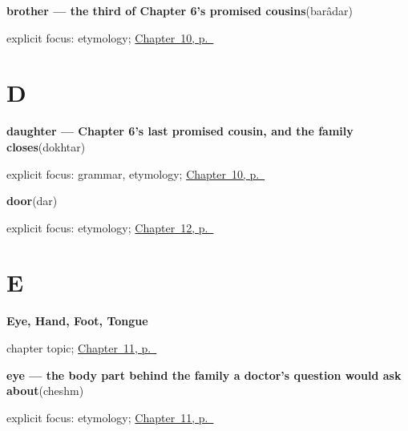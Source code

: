 \noindent\begin{minipage}[t]{\linewidth}
\raggedright
\textbf{brother — the third of Chapter 6's promised cousins}\enspace\emph{}\enspace(barâdar)\par
\footnotesize explicit focus: etymology; \hyperref[ch:fa-family]{Chapter~10, p.~\pageref*{ch:fa-family}}
\end{minipage}\par\smallskip

\section*{D}

\noindent\begin{minipage}[t]{\linewidth}
\raggedright
\textbf{daughter — Chapter 6's last promised cousin, and the family closes}\enspace\emph{}\enspace(dokhtar)\par
\footnotesize explicit focus: grammar, etymology; \hyperref[ch:fa-family]{Chapter~10, p.~\pageref*{ch:fa-family}}
\end{minipage}\par\smallskip

\noindent\begin{minipage}[t]{\linewidth}
\raggedright
\textbf{door}\enspace\emph{}\enspace(dar)\par
\footnotesize explicit focus: etymology; \hyperref[ch:fa-name-heart-door-book]{Chapter~12, p.~\pageref*{ch:fa-name-heart-door-book}}
\end{minipage}\par\smallskip

\section*{E}

\noindent\begin{minipage}[t]{\linewidth}
\raggedright
\textbf{Eye, Hand, Foot, Tongue}\par
\footnotesize chapter topic; \hyperref[ch:fa-body]{Chapter~11, p.~\pageref*{ch:fa-body}}
\end{minipage}\par\smallskip

\noindent\begin{minipage}[t]{\linewidth}
\raggedright
\textbf{eye — the body part behind the family a doctor's question would ask about}\enspace\emph{}\enspace(cheshm)\par
\footnotesize explicit focus: etymology; \hyperref[ch:fa-body]{Chapter~11, p.~\pageref*{ch:fa-body}}
\end{minipage}\par\smallskip

